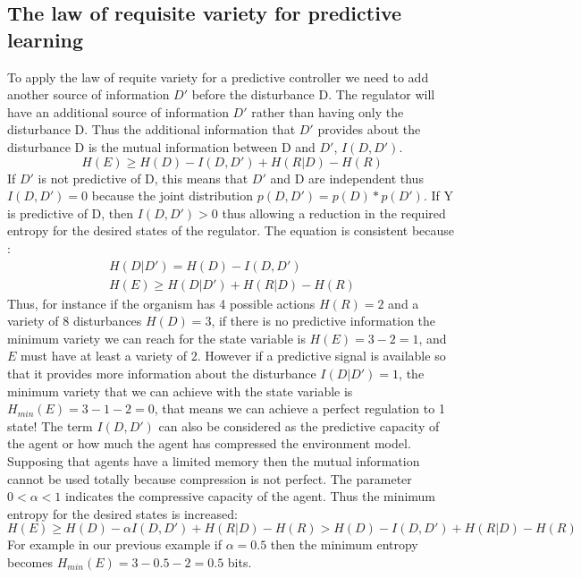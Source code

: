 \subsection{The law of requisite variety for predictive learning}
To apply the law of requite variety for a predictive controller we need to add
another source of information $D'$ before the disturbance D. The regulator will
have an additional source of information $D'$ rather than having only the disturbance D.
Thus the additional information that $D'$ provides about the disturbance D is the mutual
information between D and $D'$, $I(D,D')$.
\begin{equation}
H(E)\geq H(D)-I(D,D')+H(R|D)-H(R)
\end{equation}
If $D'$ is not predictive of D, this means that  $D'$ and D are independent thus
$I(D,D')=0$ because the joint distribution $p(D,D')=p(D)*p(D')$. 
If Y is predictive of D, then $I(D,D')>0$ thus allowing a reduction in the required entropy for the
desired states of the regulator.
The equation is consistent because :
\begin{eqnarray}
H(D|D')=H(D)-I(D,D')\\
H(E)\geq H(D|D')+H(R|D)-H(R)
\end{eqnarray}
Thus, for instance if the organism has 4 possible actions $H(R)=2$ and a variety
 of 8 disturbances $H(D)=3$, if there is no predictive information the minimum variety
 we can reach for the state variable is $H(E)=3-2=1$, and $E$ must have at least a
variety of 2. However if a predictive signal is available so that it provides more
information about the disturbance $I(D|D')=1$, the minimum variety that we can
achieve with the state variable is $H_{min}(E)=3-1-2=0$, that means we can achieve
 a perfect regulation to 1 state!
The term $I(D,D')$ can also be considered as the predictive capacity of the agent or
 how much the agent has compressed the environment model.
Supposing that agents have a limited memory then the mutual information cannot be used
 totally because compression is not perfect. The parameter $0<\alpha<1$ indicates the
compressive capacity of the agent.
Thus the minimum entropy for the desired states is increased:
\begin{equation}
H(E)\geq H(D)-\alpha I(D,D')+H(R|D)-H(R) > H(D)- I(D,D')+H(R|D)-H(R)
\end{equation}
For example in our previous example if $\alpha=0.5$ then the minimum
 entropy becomes $H_{min}(E)=3-0.5-2=0.5$ bits.


